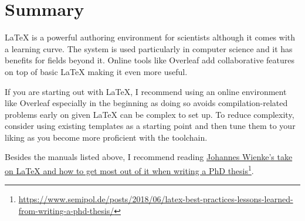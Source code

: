 \section{Summary}

LaTeX is a powerful authoring environment for scientists although it comes with a learning curve.
The system is used particularly in computer science and it has benefits for fields beyond it.
Online tools like Overleaf add collaborative features on top of basic LaTeX making it even more useful.

If you are starting out with LaTeX, I recommend using an online environment like Overleaf especially in the beginning as doing so avoids compilation-related problems early on given LaTeX can be complex to set up.
To reduce complexity, consider using existing templates as a starting point and then tune them to your liking as you become more proficient with the toolchain.

Besides the manuals listed above, I recommend reading \href{https://www.semipol.de/posts/2018/06/latex-best-practices-lessons-learned-from-writing-a-phd-thesis/}{Johannes Wienke's take on LaTeX and how to get most out of it when writing a PhD thesis}\footnote{\url{https://www.semipol.de/posts/2018/06/latex-best-practices-lessons-learned-from-writing-a-phd-thesis/}}.
